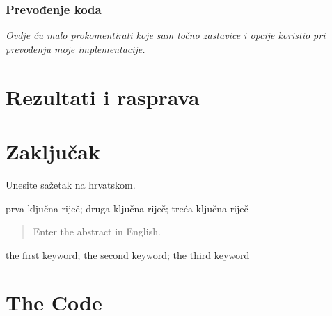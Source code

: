 \documentclass[zavrsnirad]{../fer}
\begin{document}
\subsection{Prevođenje koda}
\textit{Ovdje ću malo prokomentirati koje sam točno zastavice
i opcije koristio pri prevođenju moje implementacije.}


\chapter{Rezultati i rasprava}
\label{pog:rezultati_i_rasprava}



\chapter{Zaključak}
\label{pog:zakljucak}









\begin{sazetak}
	Unesite sažetak na hrvatskom.

\end{sazetak}

\begin{kljucnerijeci}
	prva ključna riječ; druga ključna riječ; treća ključna riječ
\end{kljucnerijeci}


\begin{abstract}
	Enter the abstract in English.

\end{abstract}

\begin{keywords}
	the first keyword; the second keyword; the third keyword
\end{keywords}



\backmatter

\chapter{The Code}
\end{document}
